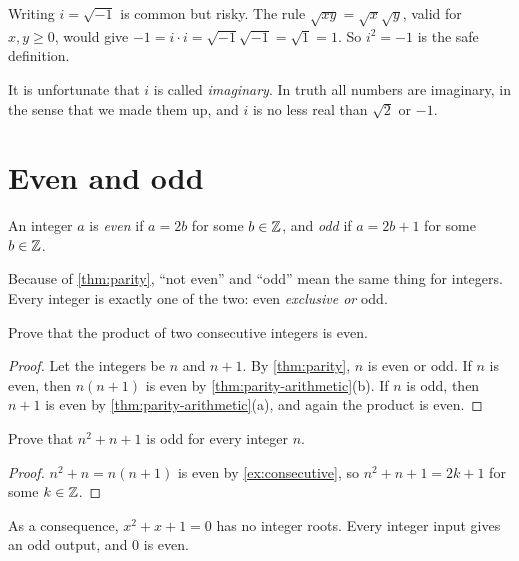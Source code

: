 \begin{remark}
  Writing $i = \sqrt{-1}$ is common but risky. The rule
  $\sqrt{xy} = \sqrt x \sqrt y$, valid for $x, y \geq 0$, would give
  $-1 = i \cdot i = \sqrt{-1}\sqrt{-1} = \sqrt{1} = 1$. So $i^2 = -1$ is the
  safe definition.

  It is unfortunate that $i$ is called \emph{imaginary}. In truth all
  numbers are imaginary, in the sense that we made them up, and $i$ is no
  less real than $\sqrt2$ or $-1$.
\end{remark}

\section{Even and odd}\label{sec:parity}

\begin{definition}\label{def:even-odd}
  An integer $a$ is \emph{even} if $a = 2b$ for some $b \in \mathbb{Z}$, and
  \emph{odd} if $a = 2b + 1$ for some $b \in \mathbb{Z}$.
\end{definition}



Because of \cref{thm:parity}, ``not even'' and ``odd'' mean the same thing
for integers. Every integer is exactly one of the two: even \emph{exclusive
or} odd.




\begin{exercise}\label{ex:consecutive}
  Prove that the product of two consecutive integers is even.
\end{exercise}

\begin{proof}
  Let the integers be $n$ and $n + 1$. By \cref{thm:parity}, $n$ is even or
  odd. If $n$ is even, then $n(n + 1)$ is even by
  \cref{thm:parity-arithmetic}(b). If $n$ is odd, then $n + 1$ is even by
  \cref{thm:parity-arithmetic}(a), and again the product is even.
\end{proof}

\begin{exercise}\label{ex:n2-n-1}
  Prove that $n^2 + n + 1$ is odd for every integer $n$.
\end{exercise}

\begin{proof}
  $n^2 + n = n(n + 1)$ is even by \cref{ex:consecutive}, so
  $n^2 + n + 1 = 2k + 1$ for some $k \in \mathbb{Z}$.
\end{proof}

\begin{remark}
  As a consequence, $x^2 + x + 1 = 0$ has no integer roots. Every integer
  input gives an odd output, and $0$ is even.
\end{remark}
